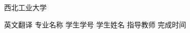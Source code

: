 \begin{titlepage}
    \voffset 2.7cm
    \begin{center}
        \begin{center}
            \begin{minipage}[c]{2.64cm}
                \centering
                \resizebox{!}{0.9cm}{ \parbox{0.54cm}{  } }
                \end{minipage}
                \hskip 0.8cm
                \begin{minipage}[c]{8cm}
                \fontsize{33}{33}\fNWPU 西北工业大学
            \end{minipage}
        \end{center}
        \vskip 0.7cm
        \sChuhao{}
        \vskip 2.5cm { \sChuhao\fHei 英文翻译 }
        \vskip 2.0cm
        {
            \sSihao\fSong 专业名称
            \vskip 0.7cm
            \sSihao\fSong 学生学号
            \vskip 0.7cm
            \sSihao\fSong 学生姓名
            \vskip 0.7cm
            \sSihao\fSong 指导教师
            \vskip 0.7cm
            \sSihao\fSong 完成时间
            \vfill
        }
    \end{center}
\end{titlepage}

\fSong \normalsize

\newpage
\thispagestyle{empty}

